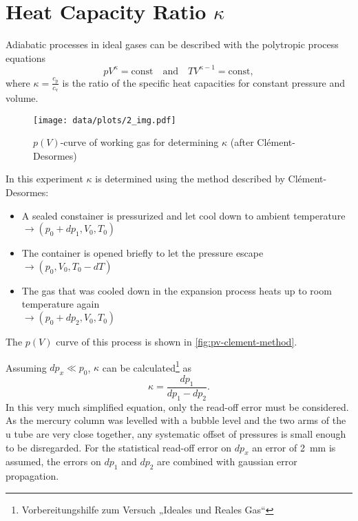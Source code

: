 \chapter{Heat Capacity Ratio $\kappa$}

Adiabatic processes in ideal gases can be described with the polytropic process equations
\begin{equation}
	pV^\kappa = \text{const} \quad \text{and} \quad TV^{\kappa - 1} = \text{const},
\end{equation}
where $\kappa = \frac{c_\text{p}}{c_\text{v}}$ is the ratio of the specific heat capacities for constant pressure and volume.

\begin{figure}[tbp]
	\centering
	\texttt{[image: data/plots/2\_img.pdf]}
	\caption{$p(V)$-curve of working gas for determining $\kappa$ (after Clément-Desormes)}
	\label{fig:pv-clement-method}
\end{figure}

In this experiment $\kappa$ is determined using the method described by Clément-Desormes:
\begin{itemize}
	\item A sealed constainer is pressurized and let cool down to ambient temperature\\
	\mbox{$\rightarrow (p_0 + dp_1, V_0, T_0)$}
	\item The container is opened briefly to let the pressure escape\\
	\mbox{$\rightarrow (p_0, V_0, T_0 - dT)$}
	\item The gas that was cooled down in the expansion process heats up to room temperature again\\
	\mbox{$\rightarrow (p_0 + dp_2, V_0, T_0)$}
\end{itemize}
The $p(V)$ curve of this process is shown in \autoref{fig:pv-clement-method}.

Assuming $dp_x \ll p_0$, $\kappa$ can be calculated\footnote{Vorbereitungshilfe zum Versuch „Ideales und Reales Gas“} as
\begin{equation}
	\kappa = \frac{dp_1}{dp_1 - dp_2}.
\end{equation}
In this very much simplified equation, only the read-off error must be considered.
As the mercury column was levelled with a bubble level and the two arms of the u tube are very close together, any systematic offset of pressures is small enough to be disregarded.
For the statistical read-off error on $dp_x$ an error of \SI{2}{\milli\meter} is assumed, the errors on $dp_1$ and $dp_2$ are combined with gaussian error propagation.

